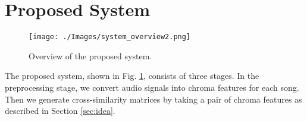 \documentclass{article}
\begin{document}
\section{Proposed System}
\label{sec:proposed_sys}

\begin{figure}[t] 
\begin{center}
\texttt{[image: ./Images/system\_overview2.png]}
\end{center}
\caption{Overview of the proposed system.} 
\label{fig:system_overview}
\end{figure}

The proposed system, shown in Fig. \ref{fig:system_overview}, consists of three stages. In the preprocessing stage, we convert audio signals into chroma features for each song. Then we generate cross-similarity matrices by taking a pair of chroma features as described in Section \ref{sec:idea}. 
\end{document}
